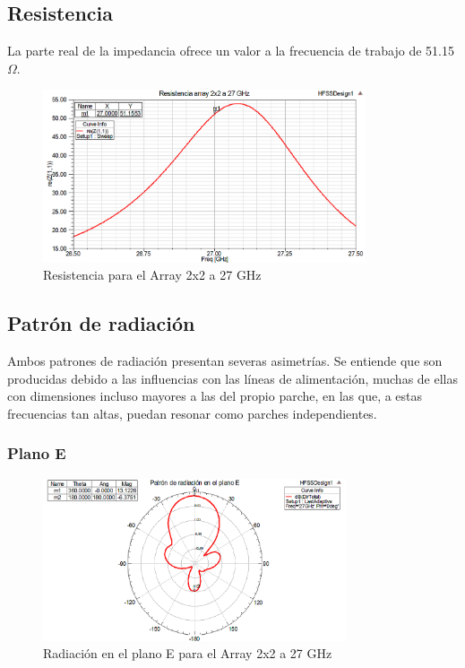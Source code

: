 \subsection{Resistencia}
\par La parte real de la impedancia ofrece un valor a la frecuencia de trabajo de 51.15 $\Omega$.
\\
\begin{figure}[H]
    \centering
        \includegraphics[width=0.85\textwidth]{archivos/analisis/2x23/3}
        \caption{Resistencia para el Array 2x2 a 27 GHz}
        \label{fig:resis2x23}
\end{figure}


\subsection{Patrón de radiación}
\par Ambos patrones de radiación presentan severas asimetrías. Se entiende que son producidas debido a las influencias con las líneas de alimentación, muchas de ellas con dimensiones incluso mayores a las del propio parche, en las que, a estas frecuencias tan altas, puedan resonar como parches independientes. 
\\
\subsubsection{Plano E}
\begin{figure}[H]
    \centering
        \includegraphics[width=0.8\textwidth]{archivos/analisis/2x23/4}
        \caption{Radiación en el plano E para el Array 2x2 a 27 GHz}
        \label{fig:E2x23}
\end{figure}

